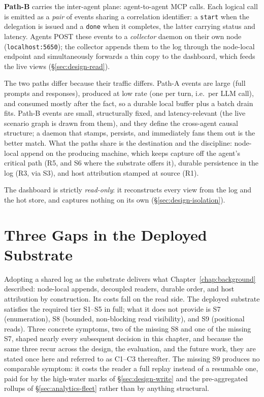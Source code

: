 \textbf{Path-B} carries the inter-agent plane: agent-to-agent MCP calls. Each
logical call is emitted as a \emph{pair} of events sharing a correlation
identifier: a \texttt{start} when the delegation is issued and a
\texttt{done} when it completes, the latter carrying status and latency. Agents
POST these events to a \emph{collector} daemon on their own node
(\texttt{localhost:5650}); the collector appends them to the log through the
node-local endpoint and simultaneously forwards a thin copy to the dashboard,
which feeds the live views (\S\ref{sec:design-read}).

The two paths differ because their traffic differs. Path-A events are large (full prompts and
responses), produced at low rate (one per turn, i.e.\ per LLM call), and
consumed mostly after the fact, so a durable local buffer plus a batch
drain fits. Path-B events are small, structurally fixed, and latency-relevant (the live
scenario graph is drawn from them), and they define the cross-agent causal
structure; a daemon that stamps, persists, and immediately fans
them out is the better match. What the paths share is the destination and the discipline: node-local
append on the producing machine, which keeps capture off the agent's
critical path (R5, and S6 where the substrate offers it),
durable persistence in the log (R3, via S3),
and host attribution stamped at source (R1).

The dashboard is strictly \emph{read-only}: it reconstructs every view from
the log and the hot store, and captures nothing on its own
(\S\ref{sec:design-isolation}).

\section{Three Gaps in the Deployed Substrate}
\label{sec:design-gaps}
\label{sec:design-constraints}

Adopting a shared log as the substrate delivers what
Chapter~\ref{chap:background} described: node-local appends,
decoupled readers, durable order, and host attribution by construction.
Its costs fall on the read side. The deployed substrate satisfies the required
tier S1--S5 in full; what it does not provide is S7 (enumeration), S8
(bounded, non-blocking read visibility), and S9 (positional reads). Three
concrete symptoms, two of the missing S8 and one of the missing S7, shaped
nearly every subsequent decision
in this chapter, and because the same three recur across the design, the
evaluation, and the future work, they are stated once here and referred to
as C1--C3 thereafter. The missing S9 produces no comparable symptom: it
costs the reader a full replay instead of a resumable one, paid for by the
high-water marks of \S\ref{sec:design-write} and the pre-aggregated rollups
of \S\ref{sec:analytics-fleet} rather than by anything structural.

